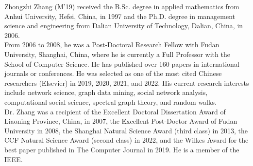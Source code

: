 \documentclass[10pt,twocolumn,twoside]{IEEEtran}
\newcommand{\biophoto}[1]{\texttt{[image: \#1]}}
\begin{document}
\begin{IEEEbiographynophoto}{Zhongzhi Zhang}
    (M'19)	 received the B.Sc. degree in applied mathematics from Anhui University, Hefei, China, in 1997 and the Ph.D. degree in management science and engineering from Dalian University of Technology, Dalian, China, in 2006. \\
    From 2006 to 2008, he was a Post-Doctoral Research Fellow with Fudan University, Shanghai, China, where he is currently a Full Professor with the School of Computer Science. He has published over 160 papers in international journals or conferences. %
    He was selected as one of the most cited Chinese researchers
    (Elsevier) in 2019,  2020, 2021, and 2022. His current research interests include network science, graph data mining, social network analysis, computational social science, spectral graph theory, and random walks. \\
    Dr. Zhang was a recipient of the Excellent Doctoral Dissertation Award of Liaoning Province, China, in 2007, the Excellent Post-Doctor Award of Fudan University in 2008, the Shanghai Natural Science Award (third class) in 2013, the CCF Natural Science Award (second class) in 2022, and the Wilkes Award for the best paper published in The Computer Journal in 2019. He is a member of the IEEE.
\end{IEEEbiographynophoto}
\end{document}
